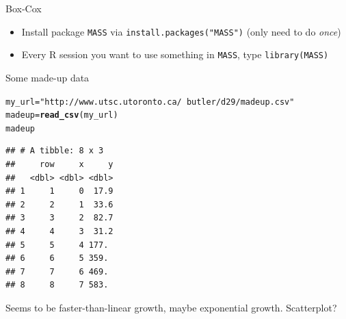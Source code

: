 \documentclass[unknownkeysallowed]{beamer}\usepackage[]{graphicx}\usepackage[]{color}
\makeatletter
\newcommand{\hlstr}[1]{\textcolor[rgb]{0.192,0.494,0.8}{#1}}%
\newcommand{\hlstd}[1]{\textcolor[rgb]{0.345,0.345,0.345}{#1}}%
\newcommand{\hlkwb}[1]{\textcolor[rgb]{0.69,0.353,0.396}{#1}}%
\newcommand{\hlkwd}[1]{\textcolor[rgb]{0.737,0.353,0.396}{\textbf{#1}}}%
\newenvironment{kframe}{%
 \def\at@end@of@kframe{}%
 \ifinner\ifhmode%
  \def\at@end@of@kframe{\end{minipage}}%
  \begin{minipage}{\columnwidth}%
 \fi\fi%
 \def\FrameCommand##1{\hskip\@totalleftmargin \hskip-\fboxsep
 \colorbox{shadecolor}{##1}\hskip-\fboxsep
     \hskip-\linewidth \hskip-\@totalleftmargin \hskip\columnwidth}%
 \MakeFramed {\advance\hsize-\width
   \@totalleftmargin\z@ \linewidth\hsize
   \@setminipage}}%
 {\par\unskip\endMakeFramed%
 \at@end@of@kframe}
\newenvironment{knitrout}{}{} %
\makeatother
\begin{document}
\begin{frame}[fragile]{Box-Cox}
  
  \begin{itemize}
  \item Install package \texttt{MASS} via
    \texttt{install.packages("MASS")} (only need to do \emph{once})
  \item Every R session you want to use something in \texttt{MASS}, type
    \texttt{library(MASS)}
    
\end{itemize}
  
\end{frame}

\begin{frame}[fragile]{Some made-up data}
  
 
\begin{knitrout}
\color{fgcolor}\begin{kframe}
\begin{alltt}
\hlstd{my_url}\hlkwb{=}\hlstr{"http://www.utsc.utoronto.ca/~butler/d29/madeup.csv"}
\hlstd{madeup}\hlkwb{=}\hlkwd{read_csv}\hlstd{(my_url)}
\hlstd{madeup}
\end{alltt}
\begin{verbatim}
## # A tibble: 8 x 3
##     row     x     y
##   <dbl> <dbl> <dbl>
## 1     1     0  17.9
## 2     2     1  33.6
## 3     3     2  82.7
## 4     4     3  31.2
## 5     5     4 177. 
## 6     6     5 359. 
## 7     7     6 469. 
## 8     8     7 583.
\end{verbatim}
\end{kframe}
\end{knitrout}
  
Seems to be faster-than-linear growth, maybe exponential growth. Scatterplot?

 

  
\end{frame}
\end{document}
